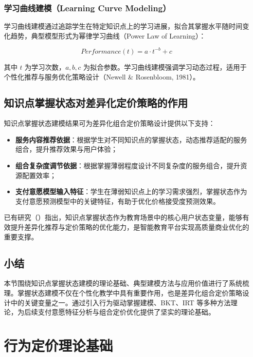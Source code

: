 \subsubsection{学习曲线建模（Learning Curve Modeling）}

学习曲线建模通过追踪学生在特定知识点上的学习进展，拟合其掌握水平随时间变化趋势，典型模型形式为幂律学习曲线（Power Law of Learning）：

\begin{equation}
Performance(t) = a \cdot t^{-b} + c
\end{equation}

其中 $t$ 为学习次数，$a, b, c$ 为拟合参数。学习曲线建模强调学习动态过程，适用于个性化推荐与服务优化策略设计（Newell \& Rosenbloom, 1981）。

\subsection{知识点掌握状态对差异化定价策略的作用}

知识点掌握状态建模结果可为差异化组合定价策略设计提供以下支持：

\begin{itemize}
  \item \textbf{服务内容推荐依据}：根据学生对不同知识点的掌握状态，动态推荐适配的服务组合，提升推荐效果与用户体验；
  \item \textbf{组合复杂度调节依据}：根据掌握薄弱程度设计不同复杂度的服务组合，提升资源配置效率；
  \item \textbf{支付意愿模型输入特征}：学生在薄弱知识点上的学习需求强烈，掌握状态作为支付意愿预测模型中的关键特征，有助于优化价格接受度预测效果。
\end{itemize}

已有研究（\cite{sun2021moocpricing,xu2019usersegmentation}）指出，知识点掌握状态作为教育场景中的核心用户状态变量，能够有效提升差异化推荐与定价策略的优化能力，是智能教育平台实现高质量商业优化的重要支撑。

\subsection*{小结}

本节围绕知识点掌握状态建模的理论基础、典型建模方法与应用价值进行了系统梳理。掌握状态建模不仅在个性化教学中具有重要作用，也是差异化组合定价策略设计中的关键变量之一。通过引入行为驱动掌握建模、BKT、IRT 等多种方法理论，为后续支付意愿特征分析与组合定价优化提供了坚实的理论基础。


\section{行为定价理论基础}
\label{sec:行为定价理论}

